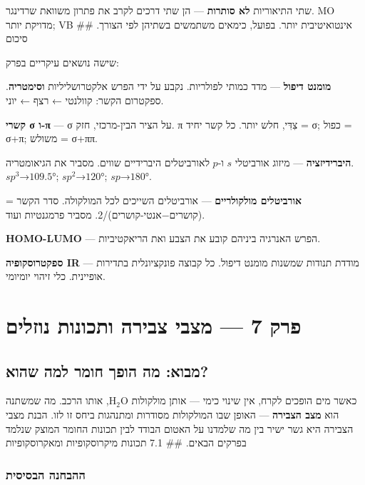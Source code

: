 \documentclass[
  hebrew,
  letterpaper,
  DIV=11,
  numbers=noendperiod]{scrreprt}
\begin{document}
שתי התיאוריות \textbf{לא סותרות} --- הן שתי דרכים לקרב את פתרון משוואת
שרדינגר. MO מדויקת יותר; VB אינטואיטיבית יותר. בפועל, כימאים משתמשים
בשתיהן לפי הצורך. \#\# סיכום

שישה נושאים עיקריים בפרק:

\textbf{מומנט דיפול} --- מדד כמותי לפולריות. נקבע על ידי הפרש
אלקטרושליליות \textbf{וסימטריה}. ספקטרום הקשר: קוולנטי ← רצף ← יוני.

\textbf{קשרי σ ו-π} --- σ על הציר הבין-מרכזי, חזק. π צִדִּי, חלש יותר. כל
קשר יחיד = σ; כפול = σ+π; משולש = σ+ππ.

\textbf{היברידיזציה} --- מיזוג אורביטלי \(s\) ו-\(p\) לאורביטלים
היברידיים שווים. מסביר את הגיאומטריה. \(sp^3\)→\(109.5°\);
\(sp^2\)→\(120°\); \(sp\)→\(180°\).

\textbf{אורביטלים מולקולריים} --- אורביטלים השייכים לכל המולקולה. סדר
הקשר = (קושרים−אנטי-קושרים)/2. מסביר פרמגנטיות ועוד.

\textbf{HOMO-LUMO} --- הפרש האנרגיה ביניהם קובע את הצבע ואת הריאקטיביות.

\textbf{ספקטרוסקופיה IR} --- מודדת תנודות שמשנות מומנט דיפול. כל קבוצה
פונקציונלית בתדירות אופיינית. כלי זיהוי יומיומי.


\chapter{פרק 7 --- מצבי צבירה ותכונות
נוזלים}\label{ux5e4ux5e8ux5e7-7-ux5deux5e6ux5d1ux5d9-ux5e6ux5d1ux5d9ux5e8ux5d4-ux5d5ux5eaux5dbux5d5ux5e0ux5d5ux5ea-ux5e0ux5d5ux5d6ux5dcux5d9ux5dd}

\section{מבוא: מה הופך חומר למה
שהוא?}\label{ux5deux5d1ux5d5ux5d0-ux5deux5d4-ux5d4ux5d5ux5e4ux5da-ux5d7ux5d5ux5deux5e8-ux5dcux5deux5d4-ux5e9ux5d4ux5d5ux5d0}

כאשר מים הופכים לקרח, אין שינוי כימי --- אותן מולקולות
\(\text{H}_2\text{O}\), אותו הרכב. מה שמשתנה הוא \textbf{מצב הצבירה} ---
האופן שבו המולקולות מסודרות ומתנהגות ביחס זו לזו. הבנת מצבי הצבירה היא
גשר ישיר בין מה שלמדנו על האטום הבודד לבין תכונות החומר המוצק שנלמד
בפרקים הבאים. \#\# 7.1 תכונות מיקרוסקופיות ומאקרוסקופיות

\subsection{ההבחנה
הבסיסית}\label{ux5d4ux5d4ux5d1ux5d7ux5e0ux5d4-ux5d4ux5d1ux5e1ux5d9ux5e1ux5d9ux5ea}
\end{document}
